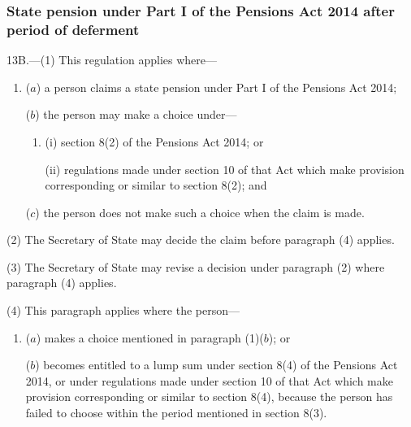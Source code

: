 \documentclass[12pt,a4paper]{article}
\begin{document}

\subsubsection[13B. State pension under Part I of the Pensions Act 2014 after period of deferment]{State pension under Part I of the Pensions Act 2014 after period of deferment}

13B.—(1) This regulation applies where—
\begin{enumerate}\item[]
($a$) a person claims a state pension under Part I of the Pensions Act 2014;

($b$) the person may make a choice under—
\begin{enumerate}\item[]
(i) section 8(2) of the Pensions Act 2014; or

(ii) regulations made under section 10 of that Act which make provision corresponding or similar to section 8(2); and
\end{enumerate}

($c$) the person does not make such a choice when the claim is made.
\end{enumerate}

(2) The Secretary of State may decide the claim before paragraph (4) applies.

(3) The Secretary of State may revise a decision under paragraph (2) where paragraph (4) applies.

(4) This paragraph applies where the person—
\begin{enumerate}\item[]
($a$) makes a choice mentioned in paragraph (1)($b$); or

($b$) becomes entitled to a lump sum under section 8(4) of the Pensions Act 2014, or under regulations made under section 10 of that Act which make provision corresponding or similar to section 8(4), because the person has failed to choose within the period mentioned in section 8(3).
\end{enumerate}

\end{document}
